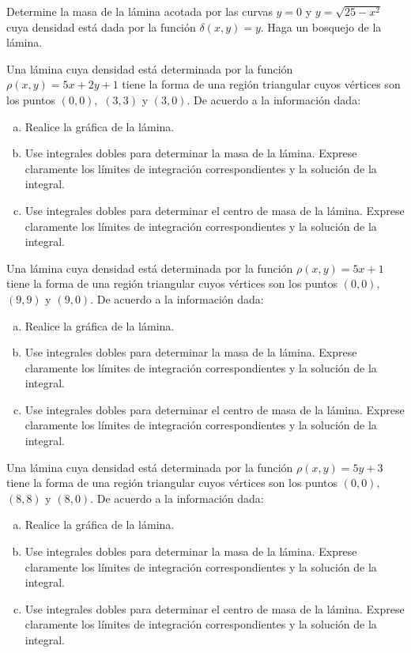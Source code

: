 \begin{prob}
Determine la masa de la lámina acotada por las curvas $y=0$ y $y=\sqrt{25-x^2}$ cuya densidad está dada por la función $\delta(x,y)=y.$ Haga un bosquejo de la lámina.
\end{prob}

\begin{prob}
Una lámina cuya densidad está determinada por la función $\rho(x,y)=5x+2y+1$ tiene la forma de una región triangular cuyos vértices son los puntos $(0,0),$ $(3,3)$ y $(3,0).$ De acuerdo a la información dada:
\begin{enumerate}[(a)] 
\item Realice la gráfica de la lámina.
\item Use integrales dobles para determinar la masa de la lámina. Exprese claramente los límites de integración correspondientes y la solución de la integral.
\item Use integrales dobles para determinar el centro de masa de la lámina. Exprese claramente los límites de integración correspondientes y la solución de la integral.
\end{enumerate}
\end{prob}

\begin{prob}
Una lámina cuya densidad está determinada por la función $\rho(x,y)=5x+1$ tiene la forma de una región triangular cuyos vértices son los puntos $(0,0),$ $(9,9)$ y $(9,0).$ De acuerdo a la información dada:
\begin{enumerate}[(a)] 
\item Realice la gráfica de la lámina.
\item Use integrales dobles para determinar la masa de la lámina. Exprese claramente los límites de integración correspondientes y la solución de la integral.
\item Use integrales dobles para determinar el centro de masa de la lámina. Exprese claramente los límites de integración correspondientes y la solución de la integral.
\end{enumerate}
\end{prob}


\begin{prob}
Una lámina cuya densidad está determinada por la función $\rho(x,y)=5y+3$ tiene la forma de una región triangular cuyos vértices son los puntos $(0,0),$ $(8,8)$ y $(8,0).$ De acuerdo a la información dada:
\begin{enumerate}[(a)]
\item Realice la gráfica de la lámina.
\item Use integrales dobles para determinar la masa de la lámina. Exprese claramente los límites de integración correspondientes y la solución de la integral.
\item Use integrales dobles para determinar el centro de masa de la lámina. Exprese claramente los límites de integración correspondientes y la solución de la integral.
\end{enumerate}
\end{prob}

